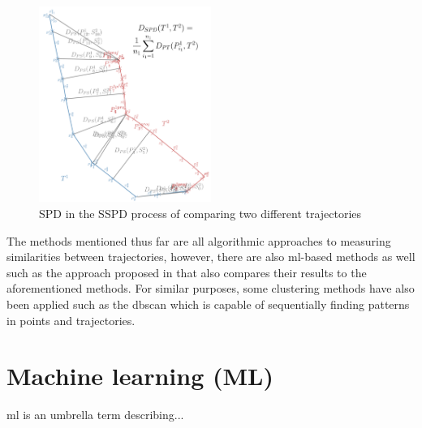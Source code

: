 \begin{figure}[htbp]  %
    \centering
    \includegraphics[width=0.5\textwidth]{figures/sspd}
    \caption{SPD in the SSPD process of comparing two different trajectories \parencite{besse2015review}}
    \label{fig:sspd}
\end{figure}

The methods mentioned thus far are all algorithmic approaches to measuring similarities between trajectories, however, there are also \acrshort{ml}-based methods as well such as the approach proposed in \cite{ZHANG2020102729} that also compares their results to the aforementioned methods. For similar purposes, some clustering methods have also been applied such as the \acrfull{dbscan} which is capable of sequentially finding patterns in points and trajectories.

\section{Machine learning (ML)}

\acrfull{ml} is an umbrella term describing...
